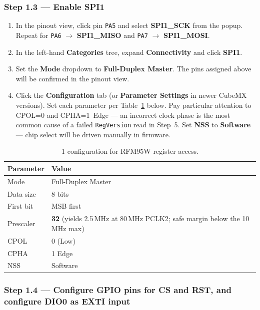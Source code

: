 \documentclass[11pt,letterpaper]{article}
\begin{document}
\subsubsection*{Step 1.3 --- Enable SPI1}

\begin{enumerate}[leftmargin=2em]
	\item In the pinout view, click pin \texttt{PA5} and select \textbf{SPI1\_SCK} from the popup. Repeat for \texttt{PA6} $\to$ \textbf{SPI1\_MISO} and \texttt{PA7} $\to$ \textbf{SPI1\_MOSI}.
	\item In the left-hand \textbf{Categories} tree, expand \textbf{Connectivity} and click \textbf{SPI1}.
	\item Set the \textbf{Mode} dropdown to \textbf{Full-Duplex Master}. The pins assigned above will be confirmed in the pinout view.
	\item Click the \textbf{Configuration} tab (or \textbf{Parameter Settings} in newer CubeMX versions). Set each parameter per Table~\ref{tab:spi-bringup} below. Pay particular attention to \mbox{CPOL}=0 and \mbox{CPHA}=1~Edge --- an incorrect clock phase is the most common cause of a failed \texttt{RegVersion} read in Step~5. Set \textbf{NSS} to \textbf{Software} --- chip select will be driven manually in firmware.
\end{enumerate}

\begin{table}[h!]
	\centering
	\caption{\SPI{}1 configuration for RFM95W register access.}
	\label{tab:spi-bringup}
	\begin{tabular}{l l}
		\toprule
		\textbf{Parameter} & \textbf{Value} \\
		\midrule
		Mode & Full-Duplex Master \\
		Data size & 8 bits \\
		First bit & \mbox{MSB} first \\
		Prescaler & \textbf{32} (yields 2.5\,MHz at 80\,MHz PCLK2; safe margin below the 10\,MHz max) \\
		\mbox{CPOL} & 0 (Low) \\
		\mbox{CPHA} & 1 Edge \\
		NSS & Software \\
		\bottomrule
	\end{tabular}
\end{table}

\subsubsection*{Step 1.4 --- Configure GPIO pins for CS and RST, and configure DIO0 as EXTI input}
\end{document}
